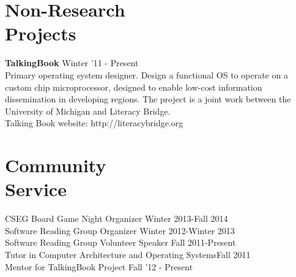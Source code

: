 \documentclass[margin, 10pt]{res} %
\begin{document}
\begin{resume}
\section{Non-Research \\ Projects}
\textbf{TalkingBook} \hfill Winter '11 - Present \\
Primary operating system designer.  Design a functional OS to operate
on a custom chip microprocessor, designed to enable low-cost
information dissemination in developing regions.  The project is a
joint work between the University of Michigan and Literacy Bridge. \\
Talking Book website: http://literacybridge.org

%
%
%

\section{Community \\ Service}
CSEG Board Game Night Organizer \hfill Winter 2013-Fall 2014 \\
Software Reading Group Organizer \hfill Winter 2012-Winter 2013 \\
Software Reading Group Volunteer Speaker \hfill Fall 2011-Present \\
Tutor in Computer Architecture and Operating Systems\hfill Fall 2011 \\
Mentor for TalkingBook Project \hfill Fall '12 - Present \\

\end{resume}
\end{document}
